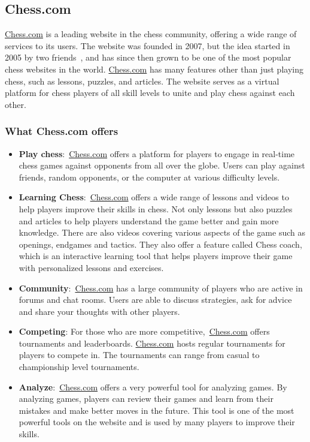 \subsection{Chess.com}\label{subsec:chess-com}

\url{Chess.com} is a leading website in the chess community, offering a wide range of services to its users.
The website was founded in 2007, but the idea started in 2005 by two friends~\cite{Chess.com}, and has since then grown
to be one of the most popular chess websites in the world.
\url{Chess.com} has many features other than just playing chess, such as lessons, puzzles, and articles.
The website serves as a virtual platform for chess players of all skill levels to unite and play chess against each
other.

\subsubsection{What Chess.com offers}\label{subsubsec:what-does-chess-com-offer}

\begin{itemize}
    \item \textbf{Play chess}:~\url{Chess.com} offers a platform for players to engage in real-time chess games against
    opponents from all over the globe.
    Users can play against friends, random opponents, or the computer at various difficulty levels.
    \item \textbf{Learning Chess}:~\url{Chess.com} offers a wide range of lessons and videos to help players
    improve their skills in chess.
    Not only lessons but also puzzles and articles to help players understand the game better and gain more knowledge.
    There are also videos covering various aspects of the game such as openings, endgames and tactics.
    They also offer a feature called Chess coach, which is an interactive learning tool that helps players improve
    their game with personalized lessons and exercises.
    \item \textbf{Community}:~\url{Chess.com} has a large community of players who are active in forums and chat rooms.
    Users are able to discuss strategies, ask for advice and share your thoughts with other players.
    \item \textbf{Competing}: For those who are more competitive,~\url{Chess.com} offers tournaments and leaderboards.
    \url{Chess.com} hosts regular tournaments for players to compete in.
    The tournaments can range from casual to championship level tournaments.
    \item \textbf{Analyze}:~\url{Chess.com} offers a very powerful tool for analyzing games.
    By analyzing games, players can review their games and learn from their mistakes and make
    better moves in the future.
    This tool is one of the most powerful tools on the website and is used by many players to improve their skills.
\end{itemize}
